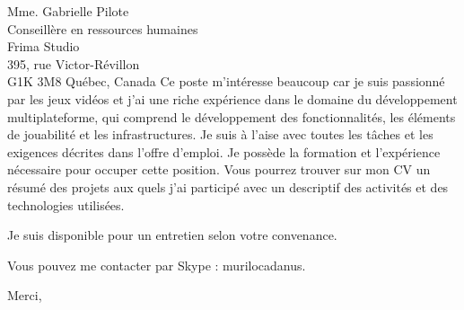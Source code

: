 \documentclass[11pt]{letter} %
\begin{document}
\begin{letter}{Mme. Gabrielle Pilote \\
Conseillère en ressources humaines \\
Frima Studio \\
395, rue Victor-Révillon \\
G1K 3M8 Québec, Canada}
Ce poste m'intéresse beaucoup car je suis passionné par les jeux vidéos et j'ai une riche expérience dans le domaine du développement multiplateforme, qui comprend le développement des fonctionnalités, les éléments de jouabilité et les infrastructures. Je suis à l'aise avec toutes les tâches et les exigences décrites dans l'offre d'emploi. Je possède la formation et l'expérience nécessaire pour occuper cette position. Vous pourrez trouver sur mon CV un résumé des projets aux quels j'ai participé avec un descriptif des activités et des technologies utilisées.

Je suis disponible pour un entretien selon votre convenance.

Vous pouvez me contacter par Skype : murilocadanus.

\closing{Merci, }


\end{letter}
\end{document}
